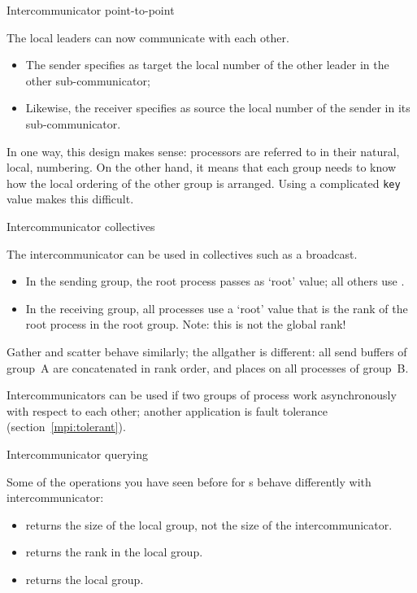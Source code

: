  {Intercommunicator point-to-point}

The local leaders can now communicate with each other.
\begin{itemize}
\item The sender specifies as target the local number of the other
  leader in the other sub-communicator;
\item Likewise, the receiver specifies as source the local number of
  the sender in its sub-communicator.
\end{itemize}
In one way, this design makes sense: processors are referred to in
their natural, local, numbering.
On the other hand, it means that each group needs to know how the
local ordering of the other group is arranged. Using a complicated
\lstinline{key} value makes this difficult.


 {Intercommunicator collectives}

The intercommunicator can be used in collectives such as
a broadcast.

\begin{itemize}
\item In the sending group, the root process passes  as
  `root' value; all others use .
\item In the receiving group, all processes use a `root' value that is the
  rank of the root process in the root group. Note: this is not the
  global rank!
\end{itemize}
Gather and scatter behave similarly; the allgather is different: all
send buffers of group~A are concatenated in rank order, and places on
all processes of group~B.

Intercommunicators can be used if two groups of process work
asynchronously with respect to each other; another application is
fault tolerance (section~\ref{mpi:tolerant}).


 {Intercommunicator querying}
\label{sec:mpi-inter-query}

Some of the operations you have seen before for
s behave differently with intercommunicator:
\begin{itemize}
\item {} returns the size of the local
  group, not the size of the intercommunicator.
\item {} returns the rank in the local
  group.
\item {} returns the local group.
\end{itemize}

